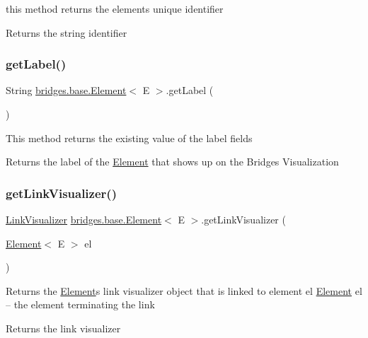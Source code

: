 this method returns the element\textquotesingle{}s unique identifier \begin{DoxyReturn}{Returns}
the string identifier 
\end{DoxyReturn}
\hypertarget{classbridges_1_1base_1_1_element_a5c831a0238de487765f6021a887f1542}{}\label{classbridges_1_1base_1_1_element_a5c831a0238de487765f6021a887f1542} 
\subsubsection{\texorpdfstring{get\+Label()}{getLabel()}}
{\footnotesize\ttfamily String \hyperlink{classbridges_1_1base_1_1_element}{bridges.\+base.\+Element}$<$ E $>$.get\+Label (\begin{DoxyParamCaption}{ }\end{DoxyParamCaption})}

This method returns the existing value of the label fields \begin{DoxyReturn}{Returns}
the label of the \hyperlink{classbridges_1_1base_1_1_element}{Element} that shows up on the Bridges Visualization 
\end{DoxyReturn}
\hypertarget{classbridges_1_1base_1_1_element_a7978552c7b36e28c302f611fc1958e7f}{}\label{classbridges_1_1base_1_1_element_a7978552c7b36e28c302f611fc1958e7f} 
\subsubsection{\texorpdfstring{get\+Link\+Visualizer()}{getLinkVisualizer()}}
{\footnotesize\ttfamily \hyperlink{classbridges_1_1base_1_1_link_visualizer}{Link\+Visualizer} \hyperlink{classbridges_1_1base_1_1_element}{bridges.\+base.\+Element}$<$ E $>$.get\+Link\+Visualizer (\begin{DoxyParamCaption}\item[{\hyperlink{classbridges_1_1base_1_1_element}{Element}$<$ E $>$}]{el }\end{DoxyParamCaption})}

Returns the \hyperlink{classbridges_1_1base_1_1_element}{Element}\textquotesingle{}s link visualizer object that is linked to element el  \hyperlink{classbridges_1_1base_1_1_element}{Element} el -- the element terminating the link \begin{DoxyReturn}{Returns}
the link visualizer 
\end{DoxyReturn}
\hypertarget{classbridges_1_1base_1_1_element_a16c4c7e0d511fbf0e205d5606b9d690e}{}\label{classbridges_1_1base_1_1_element_a16c4c7e0d511fbf0e205d5606b9d690e} 
